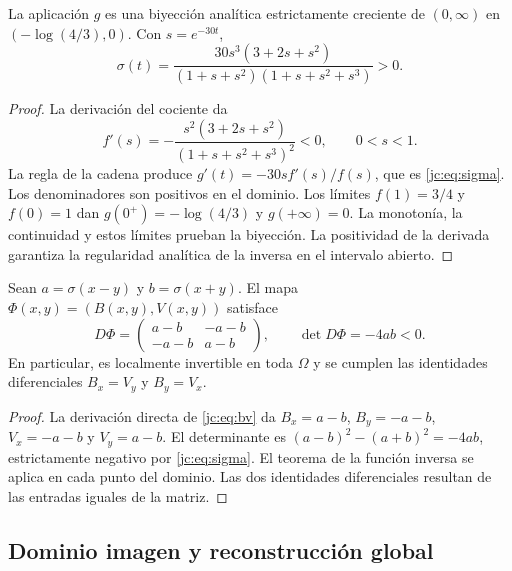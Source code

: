\begin{lemma}
La aplicación $g$ es una biyección analítica estrictamente creciente de
$(0,\infty)$ en $(-\log(4/3),0)$. Con $s=e^{-30t}$,
\begin{equation}
\sigma(t)=
\frac{30s^3(3+2s+s^2)}{(1+s+s^2)(1+s+s^2+s^3)}>0.
\label{jc:eq:sigma}
\end{equation}
\end{lemma}
\begin{proof}
La derivación del cociente da
\[
f'(s)=-\frac{s^2(3+2s+s^2)}{(1+s+s^2+s^3)^2}<0,
\qquad 0<s<1.
\]
La regla de la cadena produce
$g'(t)=-30s f'(s)/f(s)$, que es
\eqref{jc:eq:sigma}. Los denominadores son positivos en el dominio.
Los límites $f(1)=3/4$ y $f(0)=1$ dan
$g(0^+)=-\log(4/3)$ y $g(+\infty)=0$. La monotonía,
la continuidad y estos límites prueban la biyección. La positividad de
la derivada garantiza la regularidad analítica de la inversa en el
intervalo abierto.
\end{proof}

\begin{theorem}
\label{jc:thm:jacobiano}
Sean $a=\sigma(x-y)$ y $b=\sigma(x+y)$. El mapa
$\Phi(x,y)=(B(x,y),V(x,y))$ satisface
\begin{equation}
D\Phi=
\begin{pmatrix}a-b&-a-b\\-a-b&a-b\end{pmatrix},\qquad
\det D\Phi=-4ab<0.
\label{jc:eq:jacobiano}
\end{equation}
En particular, es localmente invertible en toda $\Omega$ y se cumplen
las identidades diferenciales $B_x=V_y$ y $B_y=V_x$.
\end{theorem}
\begin{proof}
La derivación directa de \eqref{jc:eq:bv} da
$B_x=a-b$, $B_y=-a-b$, $V_x=-a-b$ y $V_y=a-b$.
El determinante es
$(a-b)^2-(a+b)^2=-4ab$, estrictamente negativo por
\eqref{jc:eq:sigma}. El teorema de la función inversa se aplica en
cada punto del dominio. Las dos identidades diferenciales resultan de
las entradas iguales de la matriz.
\end{proof}

\subsection{Dominio imagen y reconstrucción global}

